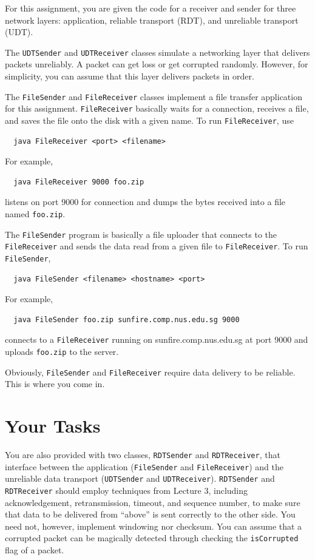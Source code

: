 \documentclass[a4paper,11pt]{exam}
\begin{document}
For this assignment, you are given the code for a receiver and sender for three network layers: application, reliable transport (RDT), and unreliable transport (UDT).

The \texttt{UDTSender} and \texttt{UDTReceiver} classes simulate a networking layer that delivers packets unreliably.  A packet can get loss or get corrupted randomly.  However, for simplicity, you can assume that this layer delivers packets in order.

The \texttt{FileSender} and \texttt{FileReceiver} classes implement a file transfer application for this assignment.  \texttt{FileReceiver} basically waits for a connection, receives a file, and saves the file onto the disk with a given name.  To run \texttt{FileReceiver}, use
\begin{verbatim}
  java FileReceiver <port> <filename>
\end{verbatim}
For example,
\begin{verbatim}
  java FileReceiver 9000 foo.zip
\end{verbatim}
listens on port 9000 for connection and dumps the bytes received into a file named \texttt{foo.zip}.

The \texttt{FileSender} program is basically a file uploader that connects to the \texttt{FileReceiver} and sends the data read from a given file to \texttt{FileReceiver}.  To run \texttt{FileSender}, 
\begin{verbatim}
  java FileSender <filename> <hostname> <port>
\end{verbatim}
For example, 
\begin{verbatim}
  java FileSender foo.zip sunfire.comp.nus.edu.sg 9000
\end{verbatim}
connects to a \texttt{FileReceiver} running on sunfire.comp.nus.edu.sg at port 9000 and uploads \texttt{foo.zip} to the server.

Obviously, \texttt{FileSender} and \texttt{FileReceiver} require data delivery to be reliable. This is where you come in.  

\section*{Your Tasks}

You are also provided with two classes, \texttt{RDTSender} and \texttt{RDTReceiver}, that interface between the application (\texttt{FileSender} and \texttt{FileReceiver}) and the unreliable data transport (\texttt{UDTSender} and \texttt{UDTReceiver}).  \texttt{RDTSender} and \texttt{RDTReceiver} should employ techniques from Lecture 3, including acknowledgement, retransmission, timeout, and sequence number, to make sure that data to be delivered from ``above'' is sent correctly to the other side.   You need not, however, implement windowing nor checksum.  You can assume that a corrupted packet can be magically detected through checking the \texttt{isCorrupted} flag of a packet.
\end{document}
